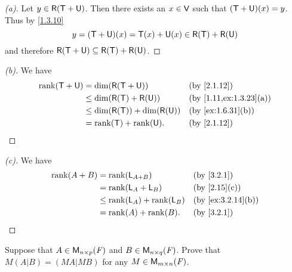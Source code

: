 \begin{proof}[(a)]
  Let \(y \in \rg{\T + \U}\).
  Then there exists an \(x \in \mathsf{V}\) such that \((\mathsf{T} + \mathsf{U})(x) = y\).
  Thus by \cref{1.3.10}
  \[
    y = (\T + \U)(x) = \T(x) + \U(x) \in \rg{\T} + \rg{\U}
  \]
  and therefore \(\rg{\T + \U} \subseteq \rg{\T} + \rg{\U}\).
\end{proof}

\begin{proof}[(b)]
  We have
  \begin{align*}
    \rk{\T + \U} & = \dim(\rg{\T + \U})               &  & \by{2.1.12}            \\
                 & \leq \dim(\rg{\T} + \rg{\U})       &  & \by{1.11,ex:1.3.23}[a] \\
                 & \leq \dim(\rg{\T}) + \dim(\rg{\U}) &  & \by{ex:1.6.31}[b]      \\
                 & = \rk{\T} + \rk{\U}.               &  & \by{2.1.12}
  \end{align*}
\end{proof}

\begin{proof}[(c)]
  We have
  \begin{align*}
    \rk{A + B} & = \rk{\L_{A + B}}          &  & \by{3.2.1}        \\
               & = \rk{\L_A + \L_B}         &  & \by{2.15}[c]      \\
               & \leq \rk{\L_A} + \rk{\L_B} &  & \by{ex:3.2.14}[b] \\
               & = \rk{A} + \rk{B}.         &  & \by{3.2.1}
  \end{align*}
\end{proof}

\begin{ex}\label{ex:3.2.15}
  Suppose that \(A \in \ms[n][p][\F]\) and \(B \in \ms[n][q][\F]\).
  Prove that \(M (A | B) = (MA | MB)\) for any \(M \in \ms\).
\end{ex}

